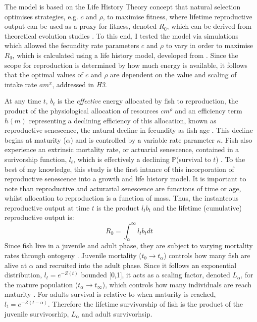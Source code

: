 \documentclass[a4paper]{article} %
\begin{document}
The model is based on the Life History Theory concept that natural selection optimises strategies, e.g. $c$ and $\rho$, to maximise fitness, where lifetime reproductive output can be used as a proxy for fitness, denoted $R_0$, which can be derived from theoretical evolution studies \autocite{Charnov2001, stearns1992evolution}. To this end, I tested the model via simulations which allowed the fecundity rate parameters $c$ and $\rho$ to vary in order to maximise $R_0$, which is calculated using a life history model, developed from \cite{Charnov2001}. Since the scope for reproduction is determined by how much energy is available, it follows that the optimal values of $c$ and $\rho$ are dependent on the value and scaling of intake rate $am^{x}$, addressed in \textit{H3}. 

At any time $t$, $b_{t}$ is the \textit{effective} energy allocated by fish to reproduction, the product of the physiological allocation of resources $cm^{\rho}$ and an efficiency term $h(m)$ representing a declining efficiency of this allocation, known as reproductive senescence, the natural decline in fecundity as fish age \autocite{Stearns2000, Benoit2018, Vrtilek2018}. This decline begins at maturity ($\alpha$) and is controlled by a variable rate parameter $\kappa$. Fish also experience an extrinsic mortality rate, or actuarial senescence, contained in a surivorship function, $l_t$, which is effectively a declining $\mathbb{P}$(survival to $t$) \autocite{Beverton1959, Peterson1984, Charnov1993,Walters1993, Charnov2001, Benoit2018, Laird2010, Reznick2002, Reznick2006}. To the best of my knowledge, this study is the first intance of this incorporation of reproductive senescence into a growth and life history model. It is important to note than reproductive and acturarial senescence are functions of time or age, whilst allocation to reproduction is a function of mass. Thus, the instanteous reproductive output at time $t$ is the product $l_{t}b_{t}$ and the lifetime (cumulative) reproductive output is:
\begin{equation}
    R_{0} = \int_{\alpha}^{\infty}l_{t}b_{t} dt
\end{equation}
Since fish live in a juvenile and adult phase, they are subject to varying mortality rates through ontogeny \autocite{Charnov2001}. Juvenile mortality ($t_0 \rightarrow t_{\alpha}$) controls how many fish are alive at $\alpha$ and recruited into the adult phase. Since it follows an exponential distribution, $l_t = e^{-Z(t)}$ bounded [0,1], it acts as a scaling factor, denoted $L_{\alpha}$, for the mature population ($t_{\alpha} \rightarrow t_{\infty}$), which controls how many individuals are reach maturity \autocite{Charnov1990-agematurity}. For adults survival is relative to when maturity is reached, $l_{t} = e^{-Z(t-\alpha)}$. Therefore the lifetime survivorship of fish is the product of the juvenile survivosrhip, $L_{\alpha}$ and adult survivorhsip.
\end{document}
